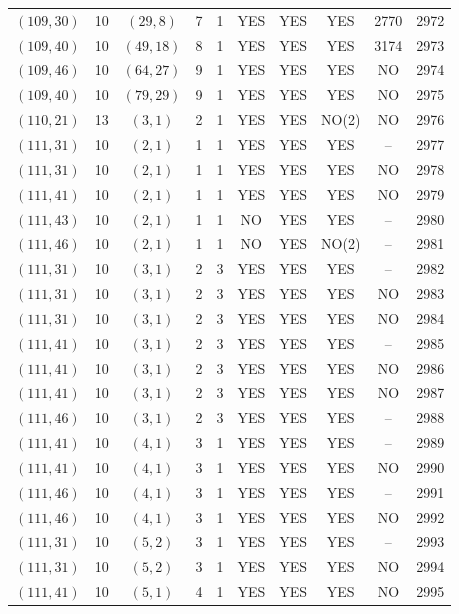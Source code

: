 \begin{longtable}{|c|c|c|c|c|c|c|c|c|c|}
$(109, 30)$ & 10 & $(29, 8)$ & 7 & 1 & YES & YES & YES & 2770 & 2972\\
$(109, 40)$ & 10 & $(49, 18)$ & 8 & 1 & YES & YES & YES & 3174 & 2973\\
$(109, 46)$ & 10 & $(64, 27)$ & 9 & 1 & YES & YES & YES & NO & 2974\\
$(109, 40)$ & 10 & $(79, 29)$ & 9 & 1 & YES & YES & YES & NO & 2975\\
$(110, 21)$ & 13 & $(3, 1)$ & 2 & 1 & YES & YES & NO(2) & NO & 2976\\
$(111, 31)$ & 10 & $(2, 1)$ & 1 & 1 & YES & YES & YES & -- & 2977\\
$(111, 31)$ & 10 & $(2, 1)$ & 1 & 1 & YES & YES & YES & NO & 2978\\
$(111, 41)$ & 10 & $(2, 1)$ & 1 & 1 & YES & YES & YES & NO & 2979\\
$(111, 43)$ & 10 & $(2, 1)$ & 1 & 1 & NO & YES & YES & -- & 2980\\
$(111, 46)$ & 10 & $(2, 1)$ & 1 & 1 & NO & YES & NO(2) & -- & 2981\\
$(111, 31)$ & 10 & $(3, 1)$ & 2 & 3 & YES & YES & YES & -- & 2982\\
$(111, 31)$ & 10 & $(3, 1)$ & 2 & 3 & YES & YES & YES & NO & 2983\\
$(111, 31)$ & 10 & $(3, 1)$ & 2 & 3 & YES & YES & YES & NO & 2984\\
$(111, 41)$ & 10 & $(3, 1)$ & 2 & 3 & YES & YES & YES & -- & 2985\\
$(111, 41)$ & 10 & $(3, 1)$ & 2 & 3 & YES & YES & YES & NO & 2986\\
$(111, 41)$ & 10 & $(3, 1)$ & 2 & 3 & YES & YES & YES & NO & 2987\\
$(111, 46)$ & 10 & $(3, 1)$ & 2 & 3 & YES & YES & YES & -- & 2988\\
$(111, 41)$ & 10 & $(4, 1)$ & 3 & 1 & YES & YES & YES & -- & 2989\\
$(111, 41)$ & 10 & $(4, 1)$ & 3 & 1 & YES & YES & YES & NO & 2990\\
$(111, 46)$ & 10 & $(4, 1)$ & 3 & 1 & YES & YES & YES & -- & 2991\\
$(111, 46)$ & 10 & $(4, 1)$ & 3 & 1 & YES & YES & YES & NO & 2992\\
$(111, 31)$ & 10 & $(5, 2)$ & 3 & 1 & YES & YES & YES & -- & 2993\\
$(111, 31)$ & 10 & $(5, 2)$ & 3 & 1 & YES & YES & YES & NO & 2994\\
$(111, 41)$ & 10 & $(5, 1)$ & 4 & 1 & YES & YES & YES & NO & 2995\\

\end{longtable}
